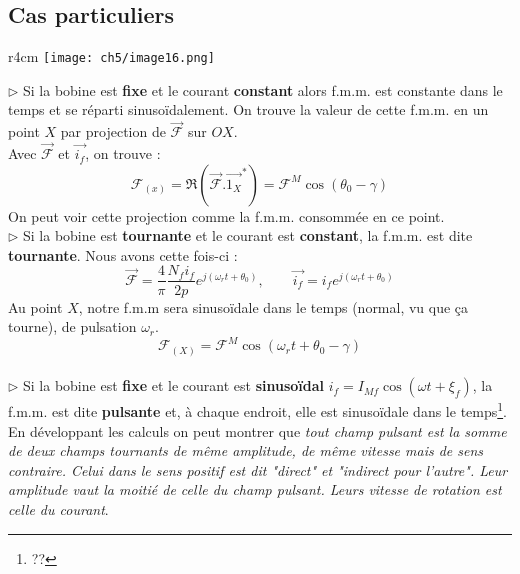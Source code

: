 		\subsection{Cas particuliers}
			\begin{wrapfigure}[11]{r}{4cm}
	\vspace{-8mm}
	\texttt{[image: ch5/image16.png]}
	\end{wrapfigure}
		$\triangleright$ Si la bobine est \textbf{fixe} et le courant \textbf{constant} 
		alors f.m.m. est constante dans le temps et se réparti sinusoïdalement. On trouve 
		la valeur de cette f.m.m. en un point $X$ par projection de $\vec{\mathcal{F}}$ 
		sur $OX$.\\
		Avec $\vec{\mathcal{F}}$ et $\vec{i_f}$, on trouve :
		\begin{equation}
		\mathcal{F}_{(x)} = \Re(\vec{\mathcal{F}}.\vec{1_X}^*) = \mathcal{F}^M\cos(
		\theta_0-\gamma)
		\end{equation}
		On peut voir cette projection comme la f.m.m. consommée en ce point.\\
		
		
		$\triangleright$ Si la bobine est \textbf{tournante} et le courant est 
		\textbf{constant}, la f.m.m. est dite \textbf{tournante}. Nous avons 
		cette fois-ci :
		\begin{equation}
		\vec{\mathcal{F}} = \frac{4}{\pi}\dfrac{N_fi_f}{2p}e^{j(\omega_rt+\theta_0)}, 
		\qquad \vec{i_f} = i_fe^{j(\omega_rt+\theta_0)}
		\end{equation}
		Au point $X$, notre f.m.m sera sinusoïdale dans le temps (normal, vu que ça 
		tourne), de pulsation $\omega_r$.
		\begin{equation}
		\mathcal{F}_{(X)} = \mathcal{F}^M\cos(\omega_rt+\theta_0-\gamma)
		\end{equation}\ \\
		
				
		$\triangleright$ Si la bobine est \textbf{fixe} et le courant est 
		\textbf{sinusoïdal} $i_f = I_{Mf}\cos(\omega t+\xi_f)$, la f.m.m. est 
		dite \textbf{pulsante} et, à chaque endroit, elle est sinusoïdale dans 
		le temps\footnote{??}.\\
		
		En développant les calculs on peut montrer que \textit{tout champ pulsant 
		est la somme de deux champs tournants de même amplitude, de même vitesse 
		mais de sens contraire. Celui dans le sens positif est dit "direct" et 
		"indirect pour l'autre". Leur amplitude vaut la moitié de celle du champ 
		pulsant. Leurs vitesse de rotation est celle du courant}.\\
		
